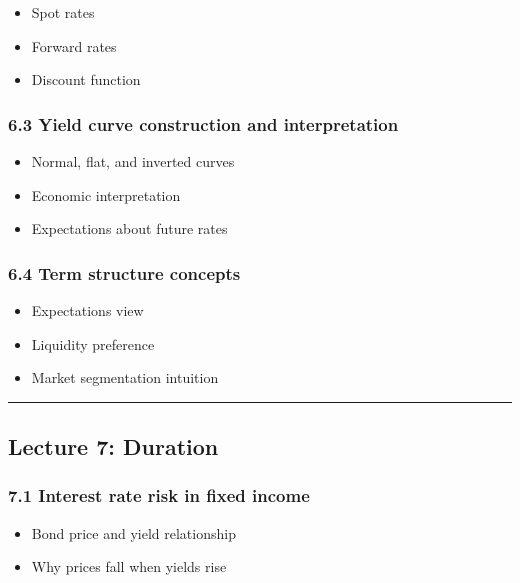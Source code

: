 \documentclass[
  letterpaper,
  DIV=11,
  numbers=noendperiod]{scrartcl}
\providecommand{\tightlist}{%
  \setlength{\itemsep}{0pt}\setlength{\parskip}{0pt}}
\begin{document}
\begin{itemize}
\tightlist
\item
  Spot rates
\item
  Forward rates
\item
  Discount function
\end{itemize}

\subsubsection{6.3 Yield curve construction and
interpretation}\label{yield-curve-construction-and-interpretation}

\begin{itemize}
\tightlist
\item
  Normal, flat, and inverted curves
\item
  Economic interpretation
\item
  Expectations about future rates
\end{itemize}

\subsubsection{6.4 Term structure
concepts}\label{term-structure-concepts}

\begin{itemize}
\tightlist
\item
  Expectations view
\item
  Liquidity preference
\item
  Market segmentation intuition
\end{itemize}

\begin{center}\rule{0.5\linewidth}{0.5pt}\end{center}

\subsection{Lecture 7: Duration}\label{lecture-7-duration}

\subsubsection{7.1 Interest rate risk in fixed
income}\label{interest-rate-risk-in-fixed-income}

\begin{itemize}
\tightlist
\item
  Bond price and yield relationship
\item
  Why prices fall when yields rise
\end{itemize}
\end{document}
